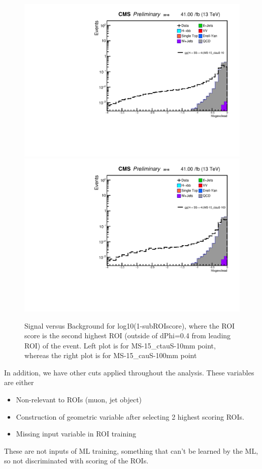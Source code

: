  \begin{figure}[h!]
   \caption{Signal versus Background for log10(1-subROIscore), where the ROI score is the second highest ROI (outside of dPhi=0.4 from leading ROI) of the event. Left plot is for MS-15\_ctauS-10mm point, whereas the right plot is for MS-15\_cauS-100mm point}
   \label{fig:excROIscore}
   \centering
   \includegraphics[width=0.47\linewidth]{figs/AnalysisNoteplot_MS-15_ctauS-10_hlogexclead.pdf}
   \includegraphics[width=0.47\linewidth]{figs/AnalysisNoteplot_MS-15_ctauS-100_hlogexclead.pdf}
 \end{figure}


In addition, we have other cuts applied throughout the analysis.
These variables are either
\begin{itemize}
 \item Non-relevant to ROIs (muon, jet object)
 \item Construction of geometric variable after selecting 2 highest scoring ROIs.
 \item Missing input variable in ROI training
\end{itemize}
These are not inputs of ML training, something that can't be learned by the ML, so not discriminated with scoring of the ROIs.

